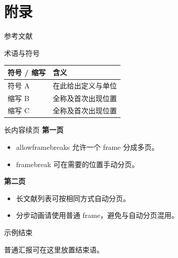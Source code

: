 \section{附录}

\begin{frame}[allowframebreaks]{参考文献}
  \small
  \printbibliography[heading=none]
\end{frame}

\begin{frame}{术语与符号}
  \small
  \begin{tabularx}{\linewidth}{@{}lY@{}}
    \toprule
    \textbf{符号 / 缩写} & \textbf{含义} \\
    \midrule
    符号 A & 在此给出定义与单位 \\
    缩写 B & 全称及首次出现位置 \\
    缩写 C & 全称及首次出现位置 \\
    \bottomrule
  \end{tabularx}
\end{frame}

\begin{frame}[allowframebreaks]{长内容续页}
  \textbf{第一页}
  \begin{itemize}
    \item allowframebreaks 允许一个 frame 分成多页。
    \item framebreak 可在需要的位置手动分页。
  \end{itemize}
  \framebreak
  \textbf{第二页}
  \begin{itemize}
    \item 长文献列表可按相同方式自动分页。
    \item 分步动画请使用普通 frame，避免与自动分页混用。
  \end{itemize}
\end{frame}

\begin{frame}
  \centering
  {示例结束\par}
  \vspace{0.8em}
  普通汇报可在这里放置结束语。
\end{frame}

